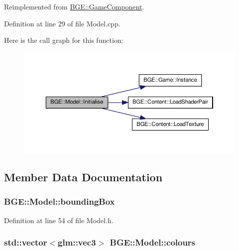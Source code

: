 Reimplemented from \hyperlink{class_b_g_e_1_1_game_component_ae1c2340cdfb31d2cd372323d3f9a1ba4}{B\-G\-E\-::\-Game\-Component}.



Definition at line 29 of file Model.\-cpp.



Here is the call graph for this function\-:
\nopagebreak
\begin{figure}[H]
\begin{center}
\leavevmode
\includegraphics[width=350pt]{class_b_g_e_1_1_model_abaa883a7def8ea1957a211bbf7b4f399_cgraph}
\end{center}
\end{figure}




\subsection{Member Data Documentation}
\hypertarget{class_b_g_e_1_1_model_a44723a79125d28e2cec5d70d4a4363d1}{
\subsubsection[{bounding\-Box}]{ B\-G\-E\-::\-Model\-::bounding\-Box}}\label{class_b_g_e_1_1_model_a44723a79125d28e2cec5d70d4a4363d1}


Definition at line 54 of file Model.\-h.

\hypertarget{class_b_g_e_1_1_model_a823f2c370081fbc2438da2de700271fd}{
\subsubsection[{colours}]{\setlength{\rightskip}{0pt plus 5cm}std\-::vector$<$glm\-::vec3$>$ B\-G\-E\-::\-Model\-::colours}}\label{class_b_g_e_1_1_model_a823f2c370081fbc2438da2de700271fd}


